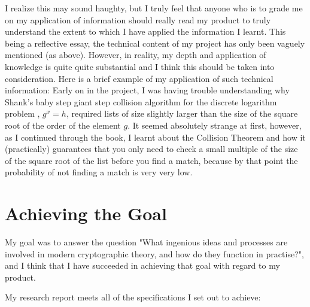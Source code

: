 \documentclass[12pt, a4paper, draft]{report}
\begin{document}
I realize this may sound haughty, but I truly feel that anyone who is to
grade me on my application of information should really read my product to
truly understand the extent to which I have applied the information I
learnt. This being a reflective essay, the technical content of my project
has only been vaguely mentioned (as above). However, in reality, my depth
and application of knowledge is quite quite substantial and I think this
should be taken into consideration. Here is a brief example of my
application of such technical information: Early on in the project, I was
having trouble understanding why Shank's baby step giant step collision
algorithm for the discrete logarithm problem \cite[p.~63]{silverman},
$g^x = h$, required lists of size slightly larger than the size of the square
root of the order of the element $g$. It seemed absolutely strange at first,
however, as I continued through the book, I learnt about the Collision Theorem
\cite[p.~228]{silverman} and how it (practically) guarantees that you only
need to check a small multiple of the size of the square root of the list
before you find a match, because by that point the probability of not finding
a match is very very low.

\section*{Achieving the Goal}

My goal was to answer the question "What ingenious ideas and processes
are involved in modern cryptographic theory, and how do they function
in practise?", and I think that I have succeeded in achieving that goal
with regard to my product.

My research report meets all of the specifications I set out to
achieve:
\end{document}
